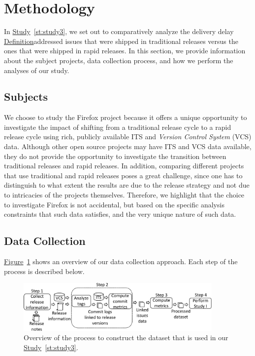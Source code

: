 \section{Methodology} \label{sec:studysettings}

In \hyperref[st:study3]{Study}~\ref{st:study3}, we set out to comparatively
analyze the delivery delay \DIFdelbegin {}\DIFdelend \DIFaddbegin {}\hyperref[def:2]{Definition}\DIFaddend addressed issues that were shipped
in traditional releases versus the ones that were shipped in rapid releases. In
this section, we provide information about the subject projects, data collection
process, and how we perform the analyses of our study.

\subsection{Subjects}

We choose to study the Firefox project because it offers a unique opportunity to
investigate the impact of shifting from a traditional release cycle to a rapid
release cycle using rich, publicly available ITS and \textit{Version Control
System} (VCS) data. Although other open source projects may have ITS and VCS
data available, they do not provide the opportunity to investigate the
transition between traditional releases and rapid releases. In addition,
comparing different projects that use traditional and rapid releases poses a
great challenge, since one has to distinguish to what extent the results are due
to the release strategy and not due to intricacies of the projects themselves.
Therefore, we highlight that the choice to investigate Firefox is not
accidental, but based on the specific analysis constraints that such data
satisfies, and the very unique nature of such data.

\subsection{Data Collection}\label{ch5:datacollection}

\hyperref[fig:database_construction]{Figure}~\ref{fig:database_construction}
shows an overview of our data collection approach. Each step of the process is
described below.

\begin{figure}[!]
	\centering
	\includegraphics[width=0.90\textwidth,keepaspectratio]
	{chapters/chapter5/figures/database_construction_final.pdf}
	\caption{
		Overview of the process to construct the dataset that is used in
		our \hyperref[st:study3]{Study}~\ref{st:study3}.
	}
	\label{fig:database_construction}
\end{figure}

